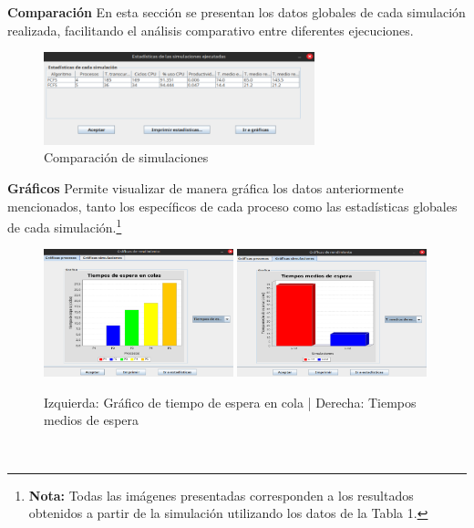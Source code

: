 \documentclass{article}
\begin{document}
\noindent
\textbf{Comparación}
En esta sección se presentan los datos globales de cada simulación realizada, facilitando el análisis comparativo entre
diferentes ejecuciones.
\begin{figure}[h]
  \centering
  \includegraphics[width=0.7\textwidth]{resources/3dComp.png}
  \caption{Comparación de simulaciones}
\end{figure}

\noindent
\textbf{Gráficos}
Permite visualizar de manera gráfica los datos anteriormente mencionados, tanto los específicos de cada proceso como las
estadísticas globales de cada simulación.\footnote{\textbf{Nota:} Todas las imágenes presentadas corresponden a los resultados obtenidos a partir de la 
simulación utilizando los datos de la Tabla 1.}

\begin{figure}[h]
  \centering
  \includegraphics[width=0.49\textwidth]{resources/3dGra1.png}
  \hfill
  \includegraphics[width=0.49\textwidth]{resources/3dGra2.png}
  \caption{Izquierda: Gráfico de tiempo de espera en cola \quad | \quad Derecha: Tiempos medios de espera}
\end{figure}
\vfil


\
\end{document}
